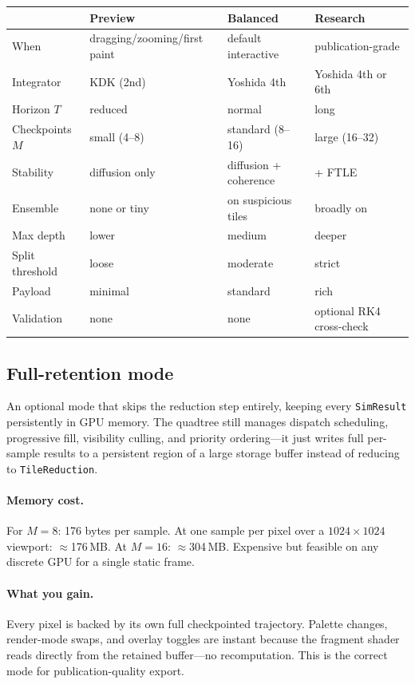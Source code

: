 \documentclass[11pt]{report}
\begin{document}
\begin{center}
\begin{tabular}{llll}
\toprule
& Preview & Balanced & Research \\
\midrule
When & dragging/zooming/first paint & default interactive & publication-grade \\
Integrator & KDK (2nd) & Yoshida 4th & Yoshida 4th or 6th \\
Horizon $T$ & reduced & normal & long \\
Checkpoints $M$ & small (4--8) & standard (8--16) & large (16--32) \\
Stability & diffusion only & diffusion + coherence & + FTLE \\
Ensemble & none or tiny & on suspicious tiles & broadly on \\
Max depth & lower & medium & deeper \\
Split threshold & loose & moderate & strict \\
Payload & minimal & standard & rich \\
Validation & none & none & optional RK4 cross-check \\
\bottomrule
\end{tabular}
\end{center}

\subsection{Full-retention mode}
\label{sec:full_retention}

An optional mode that skips the reduction step entirely, keeping every \texttt{SimResult} persistently in GPU memory. The quadtree still manages dispatch scheduling, progressive fill, visibility culling, and priority ordering---it just writes full per-sample results to a persistent region of a large storage buffer instead of reducing to \texttt{TileReduction}.

\paragraph{Memory cost.} For $M=8$: 176 bytes per sample. At one sample per pixel over a $1024\times 1024$ viewport: $\approx$176\,MB. At $M=16$: $\approx$304\,MB. Expensive but feasible on any discrete GPU for a single static frame.

\paragraph{What you gain.} Every pixel is backed by its own full checkpointed trajectory. Palette changes, render-mode swaps, and overlay toggles are instant because the fragment shader reads directly from the retained buffer---no recomputation. This is the correct mode for publication-quality export.
\end{document}
